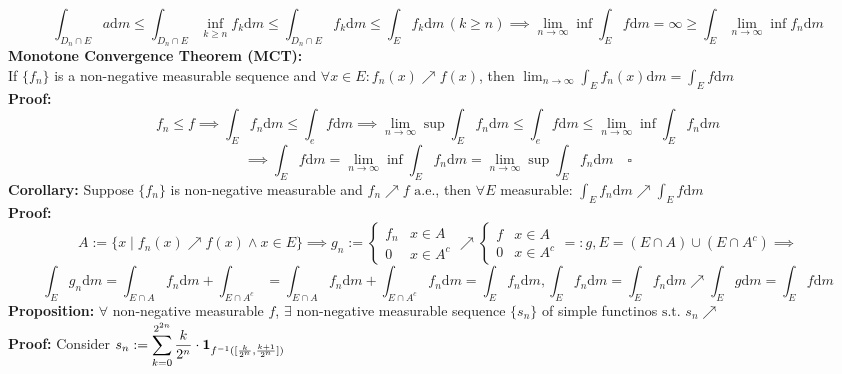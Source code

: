 \documentclass{article}
\newcommand{\limninf}{\displaystyle\lim_{n\to\infty}}
\newcommand{\st}{\mbox{ s.t. }}
\newcommand{\0}{{\bf{0}}}
\newcommand{\1}{{\bf{1}}}
\newcommand{\alev}{\mbox{ a.e.}}
\newcommand{\dint}{\displaystyle\int}
\newcommand{\dif}{\mbox{d}}
\begin{document}
$$\int_{D_n\cap E}a\dif m\le\int_{D_n\cap E}\inf_{k\geq n}f_k\dif m\le\int_{D_n\cap E}f_k\dif m\le\int_Ef_k\dif m\,(k\geq n)\implies\limninf\inf\int_Ef\dif m=\infty\geq\int_E\limninf\inf f_n\dif m$$
\textbf{Monotone Convergence Theorem (MCT):}\\
If $\{f_n\}$ is a non-negative measurable sequence and $\forall x\in E:f_n(x)\nearrow f(x)$, then $\limninf\dint_Ef_n(x)\dif m=\dint_Ef\dif m$\\
\textbf{Proof:}
$$f_n\le f\implies\int_Ef_n\dif m\le\int_ef\dif m\implies\limninf\sup\int_Ef_n\dif m\le\int_ef\dif m\le\limninf\inf\int_Ef_n\dif m$$
$$\implies\int_Ef\dif m=\limninf\inf\int_Ef_n\dif m=\limninf\sup\int_Ef_n\dif m\quad\square$$
\textbf{Corollary:} Suppose $\{f_n\}$ is non-negative measurable and $f_n\nearrow f\alev$, then $\forall E$ measurable: $\dint_Ef_n\dif m\nearrow\dint_Ef\dif m$\\
\textbf{Proof:}
$$A:=\{x\mid f_n(x)\nearrow f(x)\land x\in E\}\implies g_n:=\begin{cases}
    f_n&x\in A\\
    0&x\in A^c
\end{cases}\nearrow\begin{cases}
    f&x\in A\\
    0&x\in A^c
\end{cases}=:g,E=(E\cap A)\cup(E\cap A^c)\implies$$
$$\int_Eg_n\dif m=\int_{E\cap A}f_n\dif m+\int_{E\cap A^c}=\int_{E\cap A}f_n\dif m+\int_{E\cap A^c}f_n\dif m=\int_Ef_n\dif m,\int_Ef_n\dif m=\int_Ef_n\dif m\nearrow\int_Eg\dif m=\int_Ef\dif m$$
\textbf{Proposition:} $\forall$ non-negative measurable $f$, $\exists$ non-negative measurable sequence $\{s_n\}$ of simple functinos$\st s_n\nearrow$\\
\textbf{Proof:} Consider $s_n:=\displaystyle\sum_{k=0}^{2^{2n}}\dfrac{k}{2^n}\cdot\1_{f^{-1}([\frac{k}{2^n},\frac{k+1}{2^n}])}$
\end{document}
